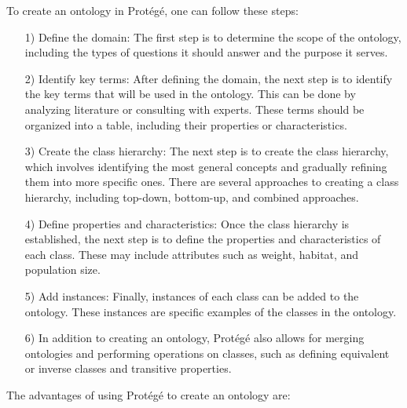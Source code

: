 \documentclass[a4paper,10pt,twocolumn]{article}
\begin{document}
To create an ontology in Protégé, one can follow these
steps:
\begin{enumerate}
	\item[1)]{Define the domain: The first step is to determine
	the scope of the ontology, including the types
	of questions it should answer and the purpose it
	serves.}
	\item[2)]{Identify key terms: After defining the domain, the
	next step is to identify the key terms that will be
	used in the ontology. This can be done by analyzing
	literature or consulting with experts. These
	terms should be organized into a table, including
	their properties or characteristics.}
	\item[3)]{Create the class hierarchy: The next step is to create
	the class hierarchy, which involves identifying
	the most general concepts and gradually refining
	them into more specific ones. There are several
	approaches to creating a class hierarchy, including
	top-down, bottom-up, and combined approaches.}
	\item[4)]{Define properties and characteristics: Once the
	class hierarchy is established, the next step is to
	define the properties and characteristics of each
	class. These may include attributes such as weight,
	habitat, and population size.}
	\item[5)]{Add instances: Finally, instances of each class
	can be added to the ontology. These instances are
	specific examples of the classes in the ontology.}
	\item[6)]{In addition to creating an ontology, Protégé also
	allows for merging ontologies and performing operations
	on classes, such as defining equivalent or
	inverse classes and transitive properties. }
\end{enumerate}

The advantages of using Protégé to create an ontology
are:

 
\end{document}
